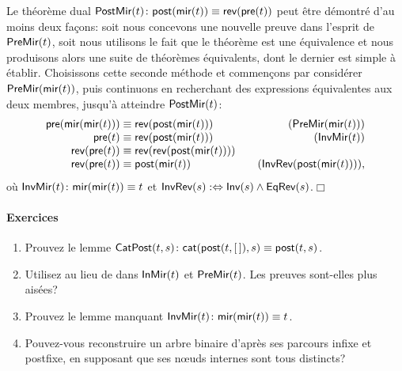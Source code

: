 Le théorème dual \(\textsf{PostMir}({t})
\colon \textsf{post}(\textsf{mir}(t)) \equiv
\textsf{rev}(\textsf{pre}(t))\)
 
 peut être démontré d'au moins deux façons:
soit nous concevons une nouvelle preuve dans l'esprit de
\(\textsf{PreMir}({t})\), soit nous utilisons le fait que le théorème est
une équivalence et nous produisons alors une suite de théorèmes
équivalents, dont le dernier est simple à établir. Choisissons cette
seconde méthode et commençons par considérer
\(\textsf{PreMir}({\textsf{mir}(t)})\),
puis continuons en recherchant des expressions équivalentes aux deux
membres, jusqu'à atteindre \(\textsf{PostMir}({t})\):
\begin{equation*}
\begin{array}{@{}r@{\;}c@{\;}l@{\qquad}r@{}}
          \fun{pre}(\fun{mir}(\fun{mir}(t)))
& \equiv
& \fun{rev}(\fun{post}(\fun{mir}(t)))
& (\pred{PreMir}{\fun{mir}(t)})\\
  \fun{pre}(t)
& \equiv
& \fun{rev}(\fun{post}(\fun{mir}(t)))
& (\pred{InvMir}{t})\\
  \fun{rev}(\fun{pre}(t))
& \equiv
& \fun{rev}(\fun{rev}(\fun{post}(\fun{mir}(t))))\\
  \fun{rev}(\fun{pre}(t))
& \equiv
& \fun{post}(\fun{mir}(t))
& (\pred{InvRev}{\fun{post}(\fun{mir}(t))}),
\end{array}
\end{equation*}
où \(\textsf{InvMir}({t}) \colon
\textsf{mir}(\textsf{mir}(t)) \equiv t\) et
\(\textsf{InvRev}({s}) :\Leftrightarrow \textsf{Inv}({s}) \wedge
\textsf{EqRev}({s})\).\hfill\(\Box\)

\paragraph{Exercices}
\begin{enumerate}

  \item Prouvez le lemme
  \(\textsf{CatPost}({t,s}) \colon \textsf{cat}(\textsf{post}(t,[\,]),s) \equiv
  \textsf{post}(t,s)\).

  \item Utilisez  au lieu de  dans
  \(\textsf{InMir}({t})\) et \(\textsf{PreMir}({t})\). Les preuves sont-elles
  plus aisées?

  \item Prouvez le lemme manquant
  \(\textsf{InvMir}({t}) \colon \textsf{mir}(\textsf{mir}(t)) \equiv
  t\).\label{ex_mir_mir}

\item Pouvez-vous reconstruire un arbre binaire d'après ses parcours
  infixe et postfixe, en supposant que ses nœuds internes sont
  tous distincts?

\end{enumerate}

